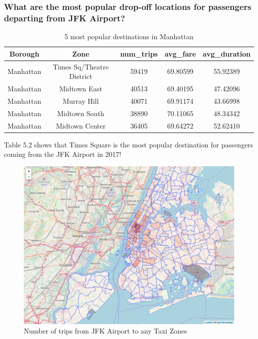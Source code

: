 \documentclass[12pt,twoside]{reedthesis}
\theoremstyle{definition}
\theoremstyle{definition}
\theoremstyle{definition}
\theoremstyle{remark}
\begin{document}
\subsubsection{What are the most popular drop-off locations for
passengers departing from JFK
Airport?}\label{what-are-the-most-popular-drop-off-locations-for-passengers-departing-from-jfk-airport}
\begin{table}

\caption{\label{tab:unnamed-chunk-98}5 most popular destinations in Manhattan}
\centering
\begin{tabular}[t]{ccccc}
\toprule
Borough & Zone & num\_trips & avg\_fare & avg\_duration\\
\midrule
Manhattan & Times Sq/Theatre District & 59419 & 69.80599 & 55.92389\\
Manhattan & Midtown East & 40513 & 69.40195 & 47.42096\\
Manhattan & Murray Hill & 40071 & 69.91174 & 43.66998\\
Manhattan & Midtown South & 38890 & 70.11065 & 48.34342\\
Manhattan & Midtown Center & 36405 & 69.64272 & 52.62410\\
\bottomrule
\end{tabular}
\end{table}
Table 5.2 shows that Times Square is the most popular destination for
passengers coming from the JFK Airport in 2017!
\begin{figure}

{\centering \includegraphics[width=5.84in]{figure/from_jfk_num_trips} 

}

\caption{Number of trips from JFK Airport to any Taxi Zones}\label{fig:from-jfk-num-trips}
\end{figure}
\end{document}
